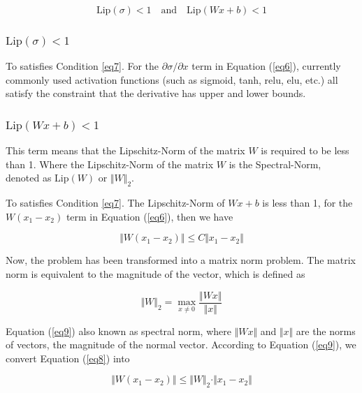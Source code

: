 \documentclass[final]{cvpr}
\begin{document}
\begin{equation}
   \text{Lip}(\sigma)<1
   \quad \text{and} \quad
   \text{Lip}(Wx+b)<1
   \label{eq7}
\end{equation}

\subsubsection{$\text{Lip}(\sigma)<1$}
To satisfies Condition \ref{eq7}. For the $\partial \sigma / \partial x$ term in Equation (\ref{eq6}), currently commonly used activation functions (such as sigmoid, tanh, relu, elu, etc.) all satisfy the constraint that the derivative has upper and lower bounds.

\subsubsection{$\text{Lip}(Wx+b)<1$}
This term means that the Lipschitz-Norm of the matrix $W$ is required to be less than 1. Where the Lipschitz-Norm of the matrix $W$ is the Spectral-Norm, denoted as $\text{Lip}(W)$ or $\Vert W\Vert_2$.

To satisfies Condition \ref{eq7}. The Lipschitz-Norm of $Wx+b$ is less than 1, for the $W(x_1-x_2)$ term in Equation (\ref{eq6}), then we have

\begin{equation}
   \Vert W(x_1-x_2)\Vert\leq C\Vert x_1-x_2 \Vert
   \label{eq8}
\end{equation}

Now, the problem has been transformed into a matrix norm problem. The matrix norm is equivalent to the magnitude of the vector, which is defined as

\begin{equation}
   \Vert W\Vert_2 = \max_{x\neq 0}\frac{\Vert Wx\Vert}{\Vert x\Vert}
   \label{eq9}
\end{equation}

Equation (\ref{eq9}) also known as spectral norm, where $\Vert Wx\Vert$ and $\Vert x\Vert$ are the norms of vectors, the magnitude of the normal vector. According to Equation (\ref{eq9}), we convert Equation (\ref{eq8}) into

\begin{equation}
   \Vert W(x_1-x_2)\Vert\leq \Vert W\Vert_2\cdot\Vert x_1-x_2 \Vert
   \label{eq10}
\end{equation}
\end{document}
